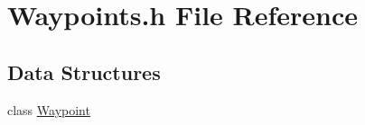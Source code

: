 \hypertarget{a00047}{\section{Waypoints.\-h File Reference}
\label{a00047}
}
\subsection*{Data Structures}
\begin{DoxyCompactItemize}
\item 
class \hyperlink{a00017}{Waypoint}
\end{DoxyCompactItemize}
